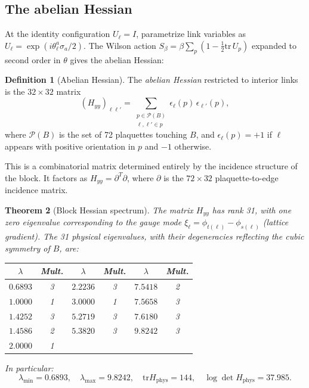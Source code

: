 \documentclass[11pt]{article}
\newtheorem{theorem}{Theorem}[section]
\theoremstyle{definition}
\newtheorem{definition}[theorem]{Definition}
\newcommand{\tr}{\mathrm{tr}}
\begin{document}
\subsection{The abelian Hessian}\label{subsec:hessian}

At the identity configuration $U_\ell=I$, parametrize link variables as
$U_\ell=\exp(i\theta_\ell^a\sigma_a/2)$.  The Wilson action
$S_\beta=\beta\sum_p(1-\frac{1}{2}\tr\,U_p)$ expanded to second order
in $\theta$ gives the abelian Hessian:

\begin{definition}[Abelian Hessian]\label{def:Hyy}
The \emph{abelian Hessian} restricted to interior links is the
$32\times 32$ matrix
\begin{equation}\label{eq:Hyy}
(H_{yy})_{\ell\ell'}
=\sum_{\substack{p\in\mathcal{P}(B)\\\ell,\ell'\in p}}
\epsilon_\ell(p)\,\epsilon_{\ell'}(p),
\end{equation}
where $\mathcal{P}(B)$ is the set of 72 plaquettes touching $B$, and
$\epsilon_\ell(p)=+1$ if $\ell$ appears with positive orientation in
$p$ and $-1$ otherwise.
\end{definition}

This is a combinatorial matrix determined entirely by the incidence
structure of the block.  It factors as $H_{yy}=\partial^T\partial$,
where $\partial$ is the $72\times 32$ plaquette-to-edge incidence
matrix.

\begin{theorem}[Block Hessian spectrum]\label{thm:spectrum}
The matrix $H_{yy}$ has rank 31, with one zero eigenvalue corresponding
to the gauge mode $\xi_\ell=\phi_{t(\ell)}-\phi_{s(\ell)}$ (lattice
gradient).  The 31 physical eigenvalues, with their degeneracies
reflecting the cubic symmetry of $B$, are:

\begin{center}
\begin{tabular}{cccccc}
\toprule
$\lambda$ & Mult. & $\lambda$ & Mult. & $\lambda$ & Mult.\\
\midrule
$0.6893$ & 3 & $2.2236$ & 3 & $7.5418$ & 2\\
$1.0000$ & 1 & $3.0000$ & 1 & $7.5658$ & 3\\
$1.4252$ & 3 & $5.2719$ & 3 & $7.6180$ & 3\\
$1.4586$ & 2 & $5.3820$ & 3 & $9.8242$ & 3\\
$2.0000$ & 1 & & & &\\
\bottomrule
\end{tabular}
\end{center}

\noindent In particular:
\begin{equation}\label{eq:spectraldata}
\lambda_{\min}=0.6893,\quad
\lambda_{\max}=9.8242,\quad
\tr H_{\mathrm{phys}}=144,\quad
\log\det H_{\mathrm{phys}}=37.985.
\end{equation}
\end{theorem}
\end{document}
